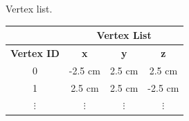 \documentclass[11pt,oneside,a4paper,final]{article}
\begin{document}
\begin{figure}[tbh]
Vertex list.\\{
{\begin{tabular}{|c|c|c|c|}
	\cline{2-4}
	\multicolumn{1}{c|}{} & \multicolumn{3}{c|}{\textbf{Vertex List}} \\
	\hline
	\textbf{Vertex ID} & \textbf{x} & \textbf{y} & \textbf{z} \\
	\hline
	 0 & -2.5 cm &  2.5 cm & 2.5 cm \\
	\hline
	 1 & 2.5 cm &  2.5 cm & -2.5 cm \\
	\hline
	 $\vdots$ & $\vdots$ & $\vdots$ & $\vdots$ \\
	\hline

\end{tabular}}}
\end{figure}
\end{document}
